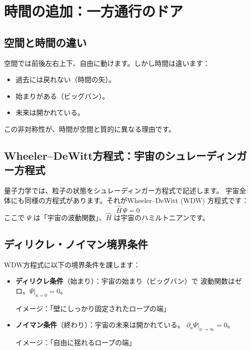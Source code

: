 \documentclass[12pt,a4paper]{article}
\begin{document}
\section{時間の追加：一方通行のドア}

\subsection{空間と時間の違い}

空間では前後左右上下、自由に動けます。しかし時間は違います：
\begin{itemize}
  \item 過去には戻れない（時間の矢）。
  \item 始まりがある（ビッグバン）。
  \item 未来は開かれている。
\end{itemize}

この非対称性が、時間が空間と質的に異なる理由です。

\subsection{Wheeler--DeWitt方程式：宇宙のシュレーディンガー方程式}

量子力学では、粒子の状態をシュレーディンガー方程式で記述します。
宇宙全体にも同様の方程式があります。それがWheeler--DeWitt (WDW) 方程式です：
\[
  \hat{H}\,\Psi = 0
\]
ここで $\Psi$ は「宇宙の波動関数」、$\hat{H}$ は宇宙のハミルトニアンです。

\subsection{ディリクレ・ノイマン境界条件}

WDW方程式に以下の境界条件を課します：

\begin{keypoint}[DN境界条件]
\begin{itemize}
  \item \textbf{ディリクレ条件}（始まり）：宇宙の始まり（ビッグバン）で
    波動関数はゼロ。$\Psi|_{a=0} = 0$。

    イメージ：「壁にしっかり固定されたロープの端」
  \item \textbf{ノイマン条件}（終わり）：宇宙の未来は開かれている。
    $\partial_a \Psi|_{a \to \infty} = 0$。

    イメージ：「自由に揺れるロープの端」
\end{itemize}
\end{keypoint}
\end{document}
